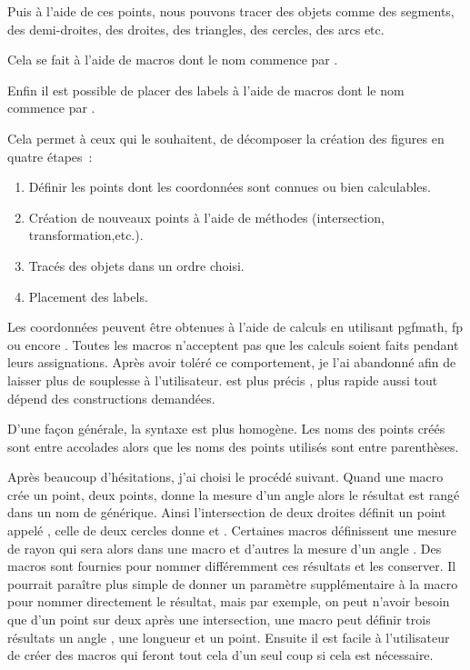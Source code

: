 Puis à l'aide de ces points, nous pouvons tracer des objets comme des segments, des demi-droites, des droites, des triangles,  des cercles, des arcs etc.

Cela se fait à l'aide de macros dont le nom commence par .

Enfin il est possible de placer des labels à l'aide de macros dont le nom commence par .

Cela permet à ceux qui le souhaitent, de décomposer la création des figures en quatre étapes~:
\begin{enumerate}
   \item Définir les points dont les coordonnées sont connues ou bien calculables.
   \item Création de nouveaux points à l'aide de méthodes (intersection, transformation,etc.).
   \item Tracés des objets dans un ordre choisi.
   \item Placement des labels.
\end{enumerate}


Les coordonnées peuvent être obtenues à l'aide de calculs en utilisant pgfmath, fp ou encore \TEX. Toutes les macros n'acceptent pas que les calculs soient  faits pendant leurs assignations. Après avoir toléré ce comportement, je l'ai abandonné afin de laisser plus de souplesse à l'utilisateur.  est plus précis , plus rapide aussi tout dépend des constructions demandées.

D'une façon générale, la syntaxe est plus homogène. Les noms des points créés sont entre accolades alors que les noms des points utilisés sont entre parenthèses. 

Après beaucoup d'hésitations, j'ai choisi le procédé suivant. Quand une macro crée un point, deux points, donne la mesure d'un angle alors le résultat est rangé dans un nom de générique. Ainsi l'intersection de deux droites définit un point appelé , celle de deux cercles donne  et . Certaines macros définissent  une mesure de rayon qui sera alors dans une macro  et d'autres la mesure d'un angle .
 Des macros sont fournies pour nommer différemment ces résultats et les conserver. Il pourrait paraître plus simple de donner un paramètre supplémentaire à la macro pour nommer directement le résultat, mais par exemple, on peut n'avoir besoin que d'un point sur deux après une intersection, une macro peut définir trois résultats un angle , une longueur et un point. Ensuite il est facile à l'utilisateur de créer des macros qui feront tout cela d'un seul coup si cela est nécessaire. 

